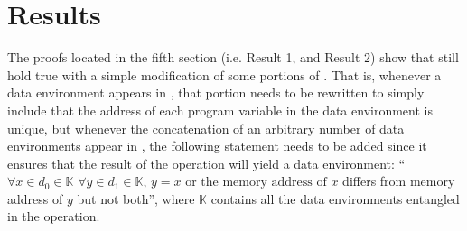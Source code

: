 \documentclass[11pt]{article}
\newcounter{definition}
\newcounter{lemma}
\newcounter{theorem}
\newcounter{example}
\newcounter{result}
\begin{document}
%
%
\section{Results}
\setcounter{definition}{0}
\setcounter{lemma}{0}
\setcounter{theorem}{0}
\setcounter{example}{0}
The proofs located in the fifth section (i.e. Result 1, and Result 2) show that \cite{baber} still hold true with a simple modification of some portions of \cite{baber}. That is, whenever a data environment appears in \cite{baber}, that portion needs to be rewritten to simply include that the address of each program variable in the data environment is unique, but whenever the concatenation of an arbitrary number of data environments appear in \cite{baber}, the following statement needs to be added since it ensures that the result of the operation will yield a data environment: ``$\forall x\in d_0\in\mathbb{K}$ $\forall y \in d_1 \in \mathbb{K}$, $y=x$ or $\text{the memory address of }x$ differs from memory address of $y$ but not both'', where $\mathbb{K}$ contains all the data environments entangled in the operation.


%
\end{document}
